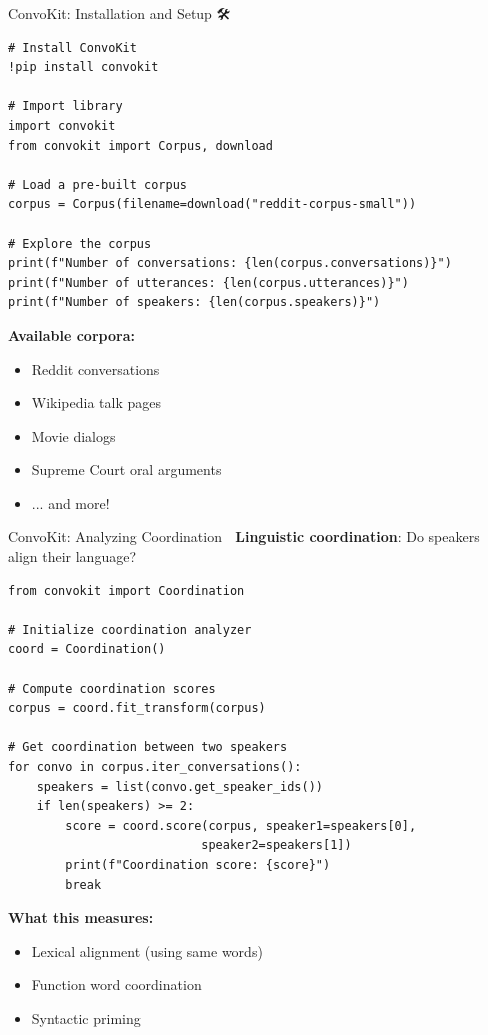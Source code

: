 \documentclass[aspectratio=169]{beamer}
\begin{document}
\begin{frame}[fragile]{ConvoKit: Installation and Setup 🛠️}
    \begin{lstlisting}
# Install ConvoKit
!pip install convokit

# Import library
import convokit
from convokit import Corpus, download

# Load a pre-built corpus
corpus = Corpus(filename=download("reddit-corpus-small"))

# Explore the corpus
print(f"Number of conversations: {len(corpus.conversations)}")
print(f"Number of utterances: {len(corpus.utterances)}")
print(f"Number of speakers: {len(corpus.speakers)}")
    \end{lstlisting}

    \vspace{0.3cm}

    \textbf{Available corpora:}
    \begin{itemize}\setlength{\itemsep}{0pt}
        \item Reddit conversations
        \item Wikipedia talk pages
        \item Movie dialogs
        \item Supreme Court oral arguments
        \item ... and more!
    \end{itemize}
\end{frame}

\begin{frame}[fragile]{ConvoKit: Analyzing Coordination 🤝}
    \textbf{Linguistic coordination}: Do speakers align their language?

    \begin{lstlisting}
from convokit import Coordination

# Initialize coordination analyzer
coord = Coordination()

# Compute coordination scores
corpus = coord.fit_transform(corpus)

# Get coordination between two speakers
for convo in corpus.iter_conversations():
    speakers = list(convo.get_speaker_ids())
    if len(speakers) >= 2:
        score = coord.score(corpus, speaker1=speakers[0],
                           speaker2=speakers[1])
        print(f"Coordination score: {score}")
        break
    \end{lstlisting}

    \vspace{0.3cm}

    \textbf{What this measures:}
    \begin{itemize}\setlength{\itemsep}{0pt}
        \item Lexical alignment (using same words)
        \item Function word coordination
        \item Syntactic priming
    \end{itemize}
\end{frame}
\end{document}

